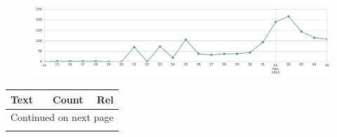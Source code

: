 \begin{figure}[htbp!]
    \centering
    \includegraphics[width=\textwidth]{twitter_all/report_images/topic-33-timeseries.jpg}
\end{figure}

\begin{longtable}{p{12.5cm}rr}
\toprule
Text & Count & Rel \\
\midrule
\endhead
\midrule
\multicolumn{3}{r}{{Continued on next page}} \\
\midrule
\endfoot


\end{longtable}

